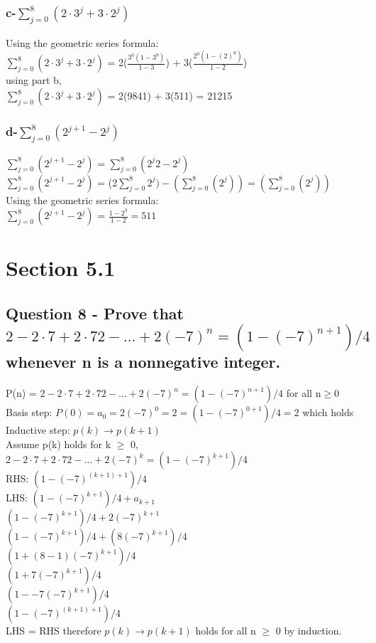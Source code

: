 \documentclass{article}
\begin{document}
\subsubsection[c]{c-$\sum_{j=0}^{8} (2 \cdot 3^j + 3\cdot 2^j) $}
Using the geometric series formula:\\
$\sum_{j=0}^{8} (2 \cdot 3^j + 3\cdot 2^j) $ = 2($\frac{3^0(1-3^9)}{1-3}$) + 3($\frac{2^0(1-(2)^9)}{1-2}$)\\
using part b, \\
$\sum_{j=0}^{8} (2 \cdot 3^j + 3\cdot 2^j) $ = 2(9841) + 3(511) = 21215

\subsubsection[d]{d-$\sum_{j=0}^{8} (2^{j+1} - 2^j) $}
$\sum_{j=0}^{8} (2^{j+1} - 2^j) $ = $\sum_{j=0}^{8} (2^{j}2 - 2^j) $\\
$\sum_{j=0}^{8} (2^{j+1} - 2^j) $ = (2$\sum_{j=0}^{8} 2^{j}) - (\sum_{j=0}^{8} (2^j)) = (\sum_{j=0}^{8} (2^j))$\\
Using the geometric series formula:\\
$\sum_{j=0}^{8} (2^{j+1} - 2^j) $ = $\frac{1-2^9}{1-2} = 511$\\


\section{Section 5.1}
\subsection{Question 8 - Prove that $2 - 2 \cdot 7 + 2 \cdot 72 - \ldots  + 2(-7)^n = (1 -(-7)^{n+1})/4$ whenever n is a nonnegative integer.}
P(n) = $2 - 2 \cdot 7 + 2 \cdot 72 - \ldots  + 2(-7)^n = (1 -(-7)^{n+1})/4$ for all n$\geq$0\\
Basis step:
$P(0) = a_0 = 2(-7)^0 = 2 = (1 -(-7)^{0+1})/4 = 2$ which holds\\
Inductive step:
$p(k) \to p(k+1)$\\
Assume p(k) holds for k $\geq$ 0, $2 - 2 \cdot 7 + 2 \cdot 72 - \ldots  + 2(-7)^k = (1 -(-7)^{k+1})/4$\\
RHS: $(1 -(-7)^{(k+1)+1})/4$\\
LHS: $(1 -(-7)^{k+1})/4 + a_{k+1}$\\
$(1 -(-7)^{k+1})/4 + 2(-7)^{k+1}$\\
$(1 -(-7)^{k+1})/4 + (8(-7)^{k+1})/4$\\
$(1 + (8-1)(-7)^{k+1})/4$\\
$(1 + 7(-7)^{k+1})/4$\\
$(1 - -7(-7)^{k+1})/4$\\
$(1 - (-7)^{(k+1)+1})/4$\\
LHS = RHS therefore $p(k) \to p(k+1)$ holds for all n $\geq$ 0 by induction.
\end{document}
